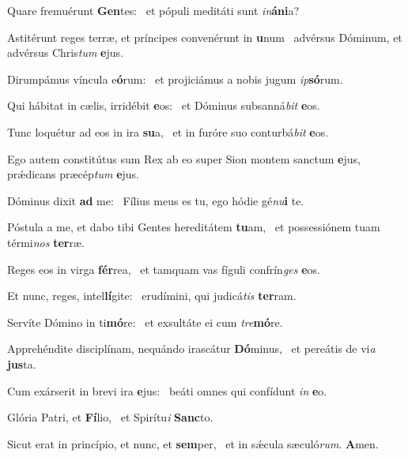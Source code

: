 \item Quare fremuérunt \textbf{Gen}tes:~\psstar{} et pópuli meditáti sunt \textit{in}\textbf{á}\textbf{ni}a?
\item Astitérunt reges terræ, et príncipes convenérunt in \textbf{u}num~\psstar{} advérsus Dóminum, et advérsus Chris\textit{tum} \textbf{e}jus.
\item Dirumpámus víncula e\textbf{ó}rum:~\psstar{} et projiciámus a nobis jugum \textit{ip}\textbf{só}rum.
\item Qui hábitat in cælis, irridébit \textbf{e}os:~\psstar{} et Dóminus subsanná\textit{bit} \textbf{e}os.
\item Tunc loquétur ad eos in ira \textbf{su}a,~\psstar{} et in furóre suo conturbá\textit{bit} \textbf{e}os.
\item Ego autem constitútus sum Rex ab eo super Sion montem sanctum \textbf{e}jus,~\psstar{} prǽdicans præcép\textit{tum} \textbf{e}jus.
\item Dóminus dixit \textbf{ad} me:~\psstar{} Fílius meus es tu, ego hódie gé\textit{nu}\textbf{i} te.
\item Póstula a me, et dabo tibi Gentes hereditátem \textbf{tu}am,~\psstar{} et possessiónem tuam térmi\textit{nos} \textbf{ter}ræ.
\item Reges eos in virga \textbf{fér}rea,~\psstar{} et tamquam vas fíguli confrín\textit{ges} \textbf{e}os.
\item Et nunc, reges, intel\textbf{lí}gite:~\psstar{} erudímini, qui judicá\textit{tis} \textbf{ter}ram.
\item Servíte Dómino in ti\textbf{mó}re:~\psstar{} et exsultáte ei cum \textit{tre}\textbf{mó}re.
\item Apprehéndite disciplínam, nequándo irascátur \textbf{Dó}minus,~\psstar{} et pereátis de vi\textit{a} \textbf{jus}ta.
\item Cum exárserit in brevi ira \textbf{e}jus:~\psstar{} beáti omnes qui confídunt \textit{in} \textbf{e}o.
\item Glória Patri, et \textbf{Fí}lio,~\psstar{} et Spirítu\textit{i} \textbf{Sanc}to.
\item Sicut erat in princípio, et nunc, et \textbf{sem}per,~\psstar{} et in sǽcula sæculó\textit{rum}. \textbf{A}men.
